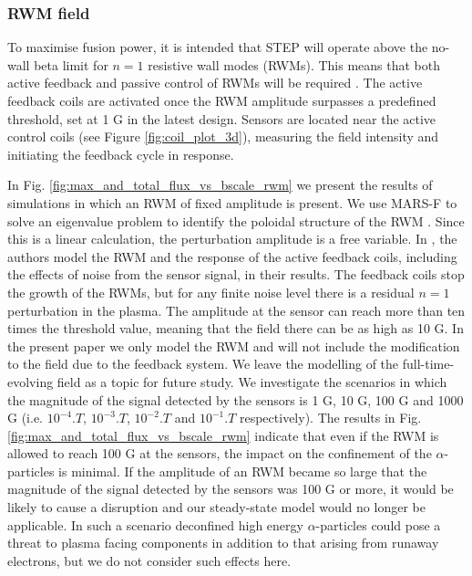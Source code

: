 \documentclass[10pt, a4paper, twoside]{article}
\begin{document}
\subsubsection{RWM field}
\label{sec:rwm_field}

To maximise fusion power, it is intended that STEP will operate above the no-wall beta limit for $n=1$ resistive wall modes (RWMs). This means that both active feedback and passive control of RWMs will be required \cite{xia2023}. The active feedback coils are activated once the RWM amplitude surpasses a predefined threshold, set at 1 G in the latest design.
Sensors are located near the active control coils (see Figure \ref{fig:coil_plot_3d}), measuring the field intensity and initiating the feedback cycle in response.

In Fig. \ref{fig:max_and_total_flux_vs_bscale_rwm} we present the results of simulations in which an RWM of fixed amplitude is present. 
We use MARS-F to solve an eigenvalue problem to identify the poloidal structure of the RWM \cite{xia2023}. Since this is a linear calculation, the perturbation amplitude is a free variable.
In \cite{xia2023}, the authors model the RWM and the response of the active feedback coils, including the effects of noise from the sensor signal, in their results. The feedback coils stop the growth of the RWMs, but for any finite noise level there is a residual $n=1$ perturbation in the plasma. The amplitude at the sensor can reach more than ten times the threshold value, meaning that the field there can be as high as 10 G. In the present paper we only model the RWM and will not include the modification to the field due to the feedback system. We leave the modelling of the full-time-evolving field as a topic for future study. We investigate the scenarios in which the magnitude of the signal detected by the sensors is 1 G, 10 G, 100 G and 1000 G (i.e. $\si{10^{-4}.T}$, $\si{10^{-3}.T}$, $\si{10^{-2}.T}$ and $\si{10^{-1}.T}$ respectively). The results in Fig. \ref{fig:max_and_total_flux_vs_bscale_rwm} indicate that even if the RWM is allowed to reach 100 G at the sensors, the impact on the confinement of the $\alpha$-particles is minimal. If the amplitude of an RWM became so large that the magnitude of the signal detected by the sensors was 100 G or more, it would be likely to cause a disruption and our steady-state model would no longer be applicable. In such a scenario deconfined high energy $\alpha$-particles could pose a threat to plasma facing components in addition to that arising from runaway electrons, but we do not consider such effects here. 
\end{document}
